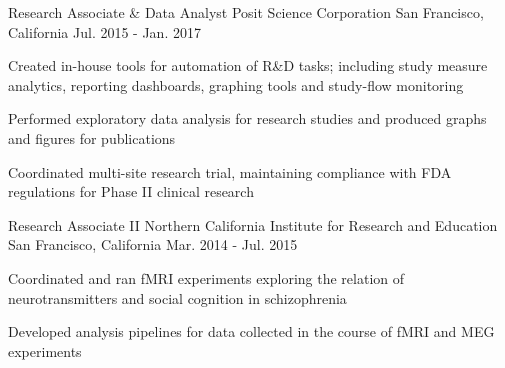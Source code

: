 \documentclass[../omelveny-cv]{subfiles}
\begin{document}
\begin{cventries}
    \cventry
    {Research Associate \& Data Analyst}
    {Posit Science Corporation}
    {San Francisco, California}
    {Jul. 2015 - Jan. 2017}
    {
        \begin{cvitems}
            \item {Created in-house tools for automation of R\&D tasks; including study measure analytics, reporting dashboards, graphing tools and study-flow monitoring}
            \item {Performed exploratory data analysis for research studies and produced graphs and figures for publications}
            \item {Coordinated multi-site research trial, maintaining compliance with FDA regulations for Phase II clinical research}
        \end{cvitems}
    }

    \cventry
    {Research Associate II}
    {Northern California Institute for Research and Education}
    {San Francisco, California}
    {Mar. 2014 - Jul. 2015}
    {
        \begin{cvitems}
            \item {Coordinated and ran fMRI experiments exploring the relation of neurotransmitters and social cognition in schizophrenia}
            \item {Developed analysis pipelines for data collected in the course of fMRI and MEG experiments}
        \end{cvitems}
    }


\end{cventries}
\end{document}
